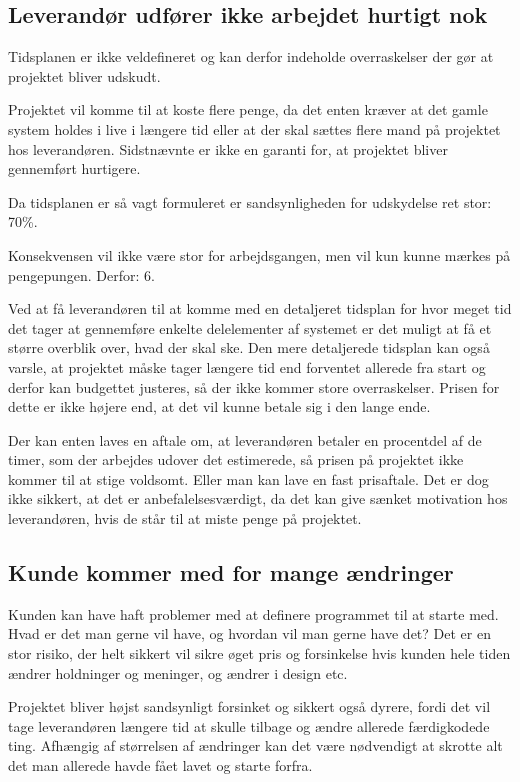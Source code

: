 \documentclass[10pt,a4paper,danish]{article}
\begin{document}
\subsection{Leverandør udfører ikke arbejdet hurtigt nok}
Tidsplanen er ikke veldefineret og kan derfor indeholde overraskelser der gør at projektet bliver udskudt.

Projektet vil komme til at koste flere penge, da det enten kræver at det gamle system holdes i live i længere tid eller at der skal sættes flere mand på projektet hos leverandøren. Sidstnævnte er ikke en garanti for, at projektet bliver gennemført hurtigere.

Da tidsplanen er så vagt formuleret er sandsynligheden for udskydelse ret stor: 70\%.

Konsekvensen vil ikke være stor for arbejdsgangen, men vil kun kunne mærkes på pengepungen. Derfor: 6.

Ved at få leverandøren til at komme med en detaljeret tidsplan for hvor meget tid det tager at gennemføre enkelte delelementer af systemet er det muligt at få et større overblik over, hvad der skal ske.
Den mere detaljerede tidsplan kan også varsle, at projektet måske tager længere tid end forventet allerede fra start og derfor kan budgettet justeres, så der ikke kommer store overraskelser.
Prisen for dette er ikke højere end, at det vil kunne betale sig i den lange ende.

Der kan enten laves en aftale om, at leverandøren betaler en procentdel af de timer, som der arbejdes udover det estimerede, så prisen på projektet ikke kommer til at stige voldsomt.
Eller man kan lave en fast prisaftale. Det er dog ikke sikkert, at det er anbefalelsesværdigt, da det kan give sænket motivation hos leverandøren, hvis de står til at miste penge på projektet.


\subsection{Kunde kommer med for mange ændringer}
Kunden kan have haft problemer med at definere programmet til at starte med. Hvad er det man gerne vil have, og hvordan vil man gerne have det? Det er en stor risiko, der helt sikkert vil sikre øget pris og forsinkelse hvis kunden hele tiden ændrer holdninger og meninger, og ændrer i design etc.

Projektet bliver højst sandsynligt forsinket og sikkert også dyrere, fordi det vil tage leverandøren længere tid at skulle tilbage og ændre allerede færdigkodede ting. Afhængig af størrelsen af ændringer kan det være nødvendigt at skrotte alt det man allerede havde fået lavet og starte forfra.
\end{document}
